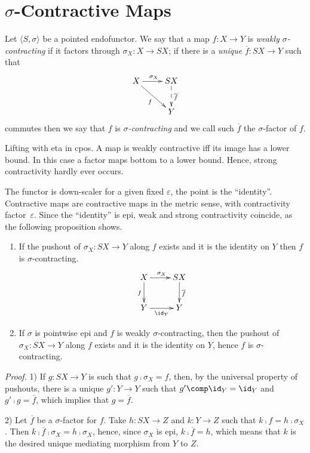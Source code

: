\documentclass[11pt,a4paper]{article}
\newcommand{\tuple}[1]{\langle #1 \rangle }
\newcommand{\contr}{\sigma}
\newcommand{\factored}[1]{\overline{#1}}
\newcommand{\esse}{S}
\begin{document}
\section{$\contr$-Contractive Maps}

\begin{definition}
  Let $\tuple{\esse , \contr}$ be a pointed endofunctor.  We say that
  a map $f:X\rightarrow Y$ is \emph{weakly $\contr$-contracting} if it
  factors through $\contr_X : X \rightarrow \esse X$; if there is a
  \emph{unique} $\factored{f} : \esse X \rightarrow Y$ such that
$$\xymatrix{
X \ar[r]^{\contr_X}  \ar[rd]_{f}  & {\esse X} \ar@{-->}[d]^{\factored{f}}  
\\
& Y
}$$
commutes then we say that $f$ is \emph{$\contr$-contracting}
and we call such $\factored{f}$ the $\contr$-factor of $f$.
\close
\end{definition}

\begin{example}
  Lifting with eta in cpos. A map is weakly contractive iff its image
  has a lower bound. In this case a factor maps bottom to a lower
  bound. Hence, strong contractivity hardly ever occurs.
\end{example}

\begin{example}
  The functor is down-scaler for a given fixed $\varepsilon$, the
  point is the ``identity''. Contractive maps are contractive maps in
  the metric sense, with contractivity factor~$\varepsilon$. Since the
  ``identity'' is epi, weak and strong contractivity coincide, as the
  following proposition shows.
\end{example}


\begin{proposition}
  \begin{enumerate}
  \item 
  If the pushout of $\contr_X : \esse X \rightarrow Y$ along
$f$ exists and it is the identity on $Y$
then $f$ is $\contr$-contracting.
$$\xymatrix{
X \ar[r]^{\contr_X}  \ar[d]_{f}  & {\esse X} \ar[d]^{\factored{f}}  
\\
Y \ar[r]_{\id_Y} & Y
}$$ 
\item 
If $\contr$ is pointwise epi and $f$ is weakly $\contr$-contracting,
then the pushout of 
$\contr_X : \esse X \rightarrow Y$ along
$f$ exists and it is the identity on $Y$,
hence $f$ is $\contr$-contracting.
  \end{enumerate}

\emph{Proof.}
1) If $g:SX \rightarrow Y$ is such that $g\comp \contr_X = f$,
then, by the universal property of pushouts,
there is a unique $g': Y\rightarrow Y$ such that
$g' \comp \id_Y = \id_Y$ and $g'\comp g = \factored{f}$,
which implies that $g=\factored{f}$. 

2) Let $\factored{f}$ be a $\contr$-factor for $f$.
Take $h:SX \rightarrow Z$ and $k:Y\rightarrow Z$
such that $k\comp f = h \comp \contr_X$. 
Then $k\comp \factored{f} \comp \contr_X = h \comp \contr_X$,
hence, since $\contr_X$ is epi, $k\comp \factored{f} = h $,
which means that $k$ is the desired 
unique mediating morphism from $Y$ to $Z$.
\close
\end{proposition}
\end{document}
